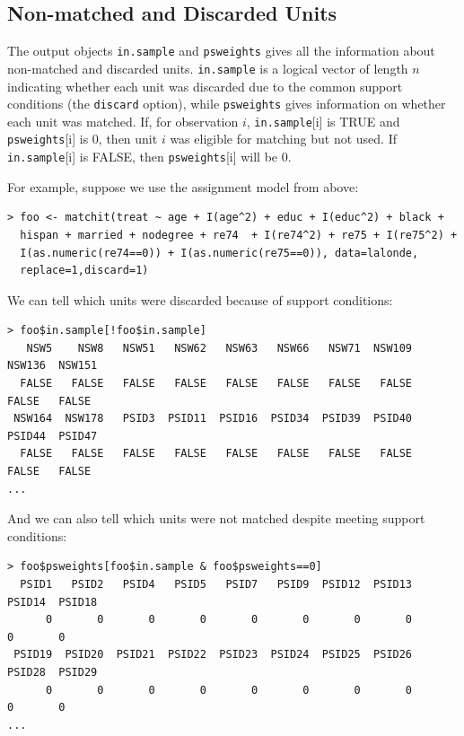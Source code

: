 \documentclass[oneside,letterpaper,titlepage]{article}
\begin{document}
\subsection{Non-matched and Discarded Units}

The output objects \texttt{in.sample} and \texttt{psweights} gives all
the information about non-matched and discarded units.
\texttt{in.sample} is a logical vector of length $n$ indicating
whether each unit was discarded due to the common support conditions
(the \texttt{discard} option), while \texttt{psweights} gives
information on whether each unit was matched.  If, for observation
$i$, \texttt{in.sample}[i] is TRUE and \texttt{psweights}[i] is $0$,
then unit $i$ was eligible for matching but not used.  If
\texttt{in.sample}[i] is FALSE, then \texttt{psweights}[i] will be
$0$.

For example, suppose we use the assignment model from above:

\begin{verbatim}
> foo <- matchit(treat ~ age + I(age^2) + educ + I(educ^2) + black +
  hispan + married + nodegree + re74  + I(re74^2) + re75 + I(re75^2) +
  I(as.numeric(re74==0)) + I(as.numeric(re75==0)), data=lalonde,
  replace=1,discard=1)
\end{verbatim}

We can tell which units were discarded because of support conditions:

\begin{verbatim}
> foo$in.sample[!foo$in.sample]
   NSW5    NSW8   NSW51   NSW62   NSW63   NSW66   NSW71  NSW109  NSW136  NSW151
  FALSE   FALSE   FALSE   FALSE   FALSE   FALSE   FALSE   FALSE   FALSE   FALSE
 NSW164  NSW178   PSID3  PSID11  PSID16  PSID34  PSID39  PSID40  PSID44  PSID47
  FALSE   FALSE   FALSE   FALSE   FALSE   FALSE   FALSE   FALSE   FALSE   FALSE
...
\end{verbatim}

And we can also tell which units were not matched despite meeting
support conditions:

\begin{verbatim}
> foo$psweights[foo$in.sample & foo$psweights==0]
  PSID1   PSID2   PSID4   PSID5   PSID7   PSID9  PSID12  PSID13  PSID14  PSID18
      0       0       0       0       0       0       0       0       0       0
 PSID19  PSID20  PSID21  PSID22  PSID23  PSID24  PSID25  PSID26  PSID28  PSID29
      0       0       0       0       0       0       0       0       0       0
...
\end{verbatim} %
\end{document}
